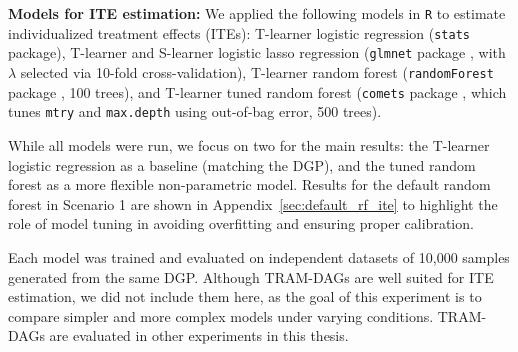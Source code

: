 \textbf{Models for ITE estimation:} We applied the following models in \texttt{R} to estimate individualized treatment effects (ITEs): T-learner logistic regression (\texttt{stats} package), T-learner and S-learner logistic lasso regression (\texttt{glmnet} package \citep{friedman2010}, with $\lambda$ selected via 10-fold cross-validation), T-learner random forest (\texttt{randomForest} package \citep{breiman2001}, 100 trees), and T-learner tuned random forest (\texttt{comets} package \citep{comets}, which tunes \texttt{mtry} and \texttt{max.depth} using out-of-bag error, 500 trees).

While all models were run, we focus on two for the main results: the T-learner logistic regression as a baseline (matching the DGP), and the tuned random forest as a more flexible non-parametric model. Results for the default random forest in Scenario 1 are shown in Appendix~\ref{sec:default_rf_ite} to highlight the role of model tuning in avoiding overfitting and ensuring proper calibration.

Each model was trained and evaluated on independent datasets of 10,000 samples generated from the same DGP. Although TRAM-DAGs are well suited for ITE estimation, we did not include them here, as the goal of this experiment is to compare simpler and more complex models under varying conditions. TRAM-DAGs are evaluated in other experiments in this thesis.
% 
% 
% 
% 


